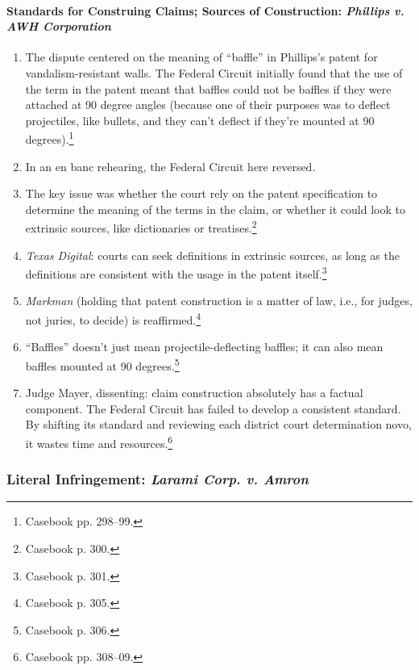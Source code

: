 \paragraph{Standards for Construing Claims; Sources of Construction: 
\emph{Phillips v. AWH Corporation}}

\begin{enumerate}
    \item The dispute centered on the meaning of ``baffle'' in Phillips's 
    patent for vandalism-resistant walls. The Federal Circuit initially found 
    that the use of the term in the patent meant that baffles could not be 
    baffles if they were attached at 90 degree angles (because one of their 
    purposes was to deflect projectiles, like bullets, and they can't deflect if 
    they're mounted at 90 degrees).\footnote{Casebook pp. 298--99.}
    \item In an en banc rehearing, the Federal Circuit here reversed.
    \item The key issue was whether the court rely on the patent specification 
    to determine the meaning of the terms in the claim, or whether it could look 
    to extrinsic sources, like dictionaries or treatises.\footnote{Casebook p. 
    300.}
    \item \emph{Texas Digital}: courts can seek definitions in extrinsic 
    sources, as long as the definitions are consistent with the usage in the 
    patent itself.\footnote{Casebook p. 301.}
    \item \emph{Markman} (holding that patent construction is a matter of law, 
    i.e., for judges, not juries, to decide) is reaffirmed.\footnote{Casebook p. 
    305.}
    \item ``Baffles'' doesn't just mean projectile-deflecting baffles; it can 
    also mean baffles mounted at 90 degrees.\footnote{Casebook p. 306.}
    \item Judge Mayer, dissenting: claim construction absolutely has a factual 
    component. The Federal Circuit has failed to develop a consistent standard. 
    By shifting its standard and reviewing each district court determination 
    novo, it wastes time and resources.\footnote{Casebook pp. 308--09.}
\end{enumerate}

\subsubsection{Literal Infringement: \emph{Larami Corp. v. Amron}}

